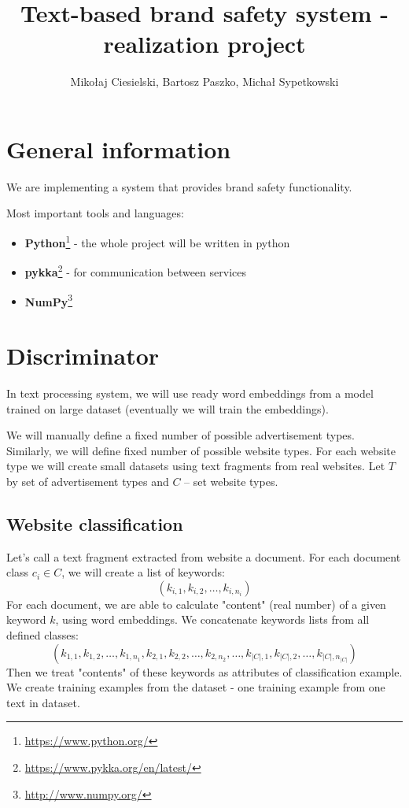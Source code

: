 \documentclass[a4paper]{article}
\begin{document}
\title{Text-based brand safety system - realization project}

\author{Mikołaj Ciesielski, Bartosz Paszko, Michał Sypetkowski}
\maketitle

\section{General information}

We are implementing a system
that provides brand safety functionality.

Most important tools and languages:
\begin{itemize}
    \item \textbf{Python}\footnote{\url{https://www.python.org/}}
        - the whole project will be written in python
    \item \textbf{pykka}\footnote{\url{https://www.pykka.org/en/latest/}}
        - for communication between services
    \item \textbf{NumPy}\footnote{\url{http://www.numpy.org/}}
\end{itemize}


\section{Discriminator}
In text processing system, we will use ready word embeddings
from a model trained on large dataset (eventually we will train the embeddings).

We will manually define a fixed number of possible advertisement types.
Similarly, we will define fixed number of possible website types.
For each website type we will create small datasets
using text fragments from real websites.
Let $T$ by set of advertisement types and $C$ -- set website types.

\subsection{Website classification}

Let's call a text fragment extracted from website a document.
For each document class $c_i\in{C}$, we will create a list of keywords:
\begin{equation}
    (k_{i,1}, k_{i,2}, \ldots, k_{i, n_i})
\end{equation}
For each document, we are able to calculate "content" (real number) of a given keyword $k$,
using word embeddings.
We concatenate keywords lists from all defined classes:
\begin{equation}
    (k_{1,1}, k_{1,2}, \ldots, k_{1, n_1},
    k_{2,1}, k_{2,2}, \ldots, k_{2, n_2},
    \ldots,
    k_{|C|,1}, k_{|C|,2}, \ldots, k_{|C|, n_{|C|}})
\end{equation}
Then we treat "contents" of these keywords as attributes of classification example.
We create training examples from the dataset - one training example from one text in dataset.
\end{document}
